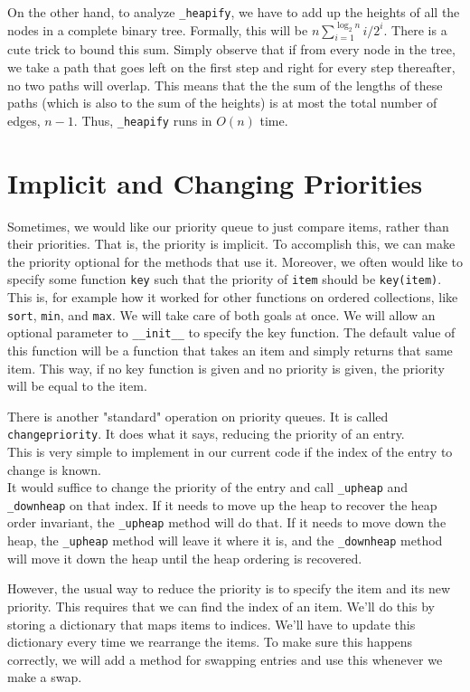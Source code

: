 On the other hand, to analyze \texttt{\_heapify}, we have to add up the heights of all the nodes in a complete binary tree.  Formally, this will be $n\sum_{i=1}^{\log_2 n}i/2^i$.  There is a cute trick to bound this sum.  Simply observe that if from every node in the tree, we take a path that goes left on the first step and right for every step thereafter, no two paths will overlap.  This means that the the sum of the lengths of these paths (which is also to the sum of the heights) is at most the total number of edges, $n-1$.  Thus, \texttt{\_heapify} runs in $O(n)$ time.

\section{Implicit and Changing Priorities}


Sometimes, we would like our priority queue to just compare items, rather than their priorities.
That is, the priority is implicit.
To accomplish this, we can make the priority optional for the methods that use it.
Moreover, we often would like to specify some function \texttt{key} such that the priority of \texttt{item} should be \texttt{key(item)}.
This is, for example how it worked for other functions on ordered collections, like \texttt{sort}, \texttt{min}, and \texttt{max}.
We will take care of both goals at once.
We will allow an optional parameter to \texttt{\_\_init\_\_} to specify the key function.
The default value of this function will be a function that takes an item and simply returns that same item.
This way, if no key function is given and no priority is given, the priority will be equal to the item.


There is another "standard" operation on priority queues.  It is called \texttt{changepriority}.  It does what it says, reducing the priority of an entry.\\
This is very simple to implement in our current code if the index of the entry to change is known.\\
It would suffice to change the priority of the entry and call \texttt{\_upheap} and \texttt{\_downheap} on that index.
If it needs to move up the heap to recover the heap order invariant, the \texttt{\_upheap} method will do that.
If it needs to move down the heap, the \texttt{\_upheap} method will leave it where it is, and the \texttt{\_downheap} method will move it down the heap until the heap ordering is recovered.


However, the usual way to reduce the priority is to specify the item and its new priority.  This requires that we can find the index of an item.  We'll do this by storing a dictionary that maps items to indices.  We'll have to update this dictionary every time we rearrange the items.  To make sure this happens correctly, we will add a method for swapping entries and use this whenever we make a swap.  


